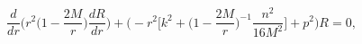 \begin{equation} \label{s r equation}
\frac{d}{dr} \biggl( r^2 \biggl( 1- \frac{2M}{r} \biggr) \frac{dR}{dr} \biggr) + \biggl(- r^2 \biggl[k^2 + \biggl(1-\frac{2M}{r}\biggr)^{-1}
\frac{n^2}{16 M^2}\biggr] +p^2 \biggr) R =0 ,
\end{equation}

